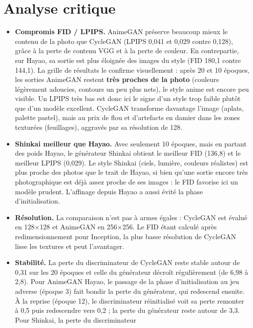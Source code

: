 \documentclass[11pt,a4paper]{article}
\begin{document}
\section{Analyse critique}
\begin{itemize}
  \item \textbf{Compromis FID / LPIPS.} AnimeGAN préserve beaucoup mieux le contenu de la photo
        que CycleGAN (LPIPS 0,041 et 0,029 contre 0,128), grâce à la perte de contenu VGG et à
        la perte de couleur. En contrepartie, sur Hayao, sa sortie est plus éloignée des images
        du style (FID 180,1 contre 144,1). La grille de résultats le confirme visuellement :
        après 20 et 10 époques, les sorties AnimeGAN restent \textbf{très proches de la photo}
        (couleurs légèrement adoucies, contours un peu plus nets), le style anime est encore
        peu visible. Un LPIPS très bas est donc ici le signe d'un style trop faible plutôt que
        d'un modèle excellent. CycleGAN transforme davantage l'image (aplats, palette pastel),
        mais au prix de flou et d'artefacts en damier dans les zones texturées (feuillages),
        aggravés par sa résolution de 128.
  \item \textbf{Shinkai meilleur que Hayao.} Avec seulement 10 époques, mais en partant des
        poids Hayao, le générateur Shinkai obtient le meilleur FID (136,8) et le meilleur
        LPIPS (0,029). Le style Shinkai (ciels, lumière, couleurs réalistes) est plus proche des
        photos que le trait de Hayao, si bien qu'une sortie encore très photographique est déjà
        assez proche de ses images : le FID favorise ici un modèle prudent. L'affinage depuis
        Hayao a aussi évité la phase d'initialisation.
  \item \textbf{Résolution.} La comparaison n'est pas à armes égales : CycleGAN est évalué en
        128$\times$128 et AnimeGAN en 256$\times$256. Le FID étant calculé après
        redimensionnement pour Inception, la plus basse résolution de CycleGAN lisse les
        textures et peut l'avantager.
  \item \textbf{Stabilité.} La perte du discriminateur de CycleGAN reste stable autour de
        0,31 sur les 20 époques et celle du générateur décroît régulièrement (de 6,98 à 2,8).
        Pour AnimeGAN Hayao, le passage de la phase d'initialisation au jeu adverse (époque 3)
        fait bondir la perte du générateur, qui redescend ensuite. À la reprise (époque 12),
        le discriminateur réinitialisé voit sa perte remonter à 0,5 puis redescendre vers 0,2
        ; la perte du générateur reste autour de 3,3. Pour Shinkai, la perte du discriminateur

\end{itemize}
\end{document}
